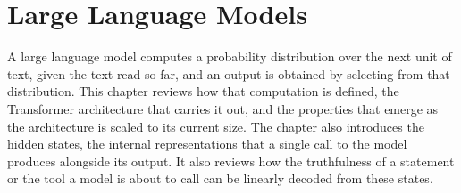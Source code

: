 \chapter{Large Language Models}
\label{chap:llm}

A large language model computes a probability distribution over the next unit of text, given the text read so far, and an output is obtained by selecting from that distribution. This chapter reviews how that computation is defined, the Transformer architecture that carries it out, and the properties that emerge as the architecture is scaled to its current size. The chapter also introduces the hidden states, the internal representations that a single call to the model produces alongside its output. It also reviews how the truthfulness of a statement or the tool a model is about to call can be linearly decoded from these states.








